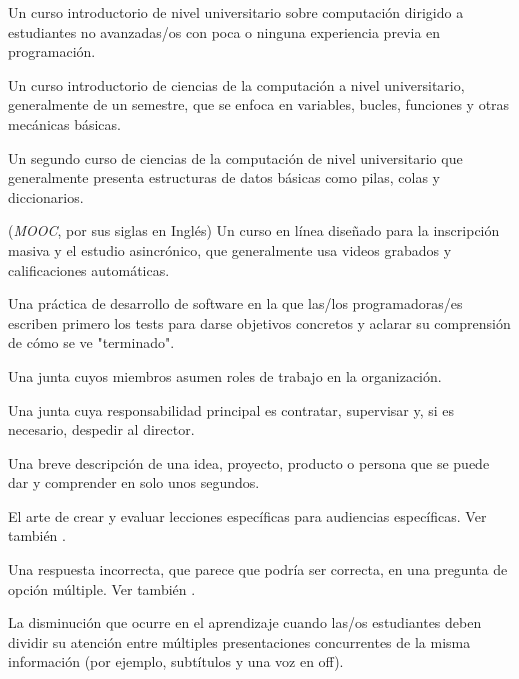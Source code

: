 \begin{description}
 Un curso introductorio de nivel universitario sobre computación
dirigido a estudiantes no avanzadas/os con poca o ninguna experiencia previa en programación.

 Un curso introductorio de ciencias de la computación a nivel universitario,
generalmente de un semestre, que se enfoca en variables, bucles, funciones y otras mecánicas básicas.

 Un segundo curso de ciencias de la computación de nivel universitario
que generalmente presenta estructuras de datos básicas como pilas, colas y diccionarios.

 (\emph{MOOC}, por sus siglas en Inglés) Un curso en línea diseñado para la inscripción masiva y el estudio asincrónico, que generalmente usa videos grabados y calificaciones automáticas.

 Una práctica de desarrollo
de software en la que las/los programadoras/es escriben primero los tests
para darse objetivos concretos y aclarar su comprensión de cómo se ve "terminado".

 Una junta cuyos miembros asumen roles de trabajo en la organización.

 Una junta cuya responsabilidad principal es
contratar, supervisar y, si es necesario, despedir al director.

 Una breve descripción de una idea,
proyecto, producto o persona que se puede dar y comprender en solo unos segundos.

 El arte de crear y evaluar
lecciones específicas para audiencias específicas. Ver también
.

 Una respuesta incorrecta, que parece que podría ser correcta, en una pregunta de opción múltiple. Ver también
.

 La disminución que ocurre
en el aprendizaje cuando las/os estudiantes deben dividir su atención entre múltiples presentaciones concurrentes de la misma información (por ejemplo, subtítulos y una voz en off).


\end{description}
